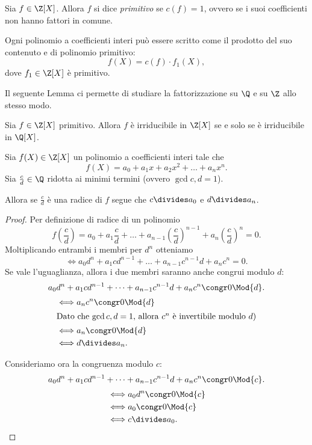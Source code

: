 \begin{definition}
    Sia $f \in \Z[X]$. Allora $f$ si dice \emph{primitivo} se $c(f) = 1$, ovvero se i suoi coefficienti non hanno fattori in comune.
\end{definition}

\begin{remark}
    Ogni polinomio a coefficienti interi può essere scritto come il prodotto del suo contenuto e di polinomio primitivo: \[
        f(X) = c(f) \cdot f_1(X),    
    \] dove $f_1 \in \Z[X]$ è primitivo.
\end{remark}

Il seguente Lemma ci permette di studiare la fattorizzazione su $\Q$ e su $\Z$ allo stesso modo.
\begin{theorem}
     Sia $f \in \Z[X]$ primitivo. Allora $f$ è irriducibile in $\Z[X]$ se e solo se è irriducibile in $\Q[X]$.
\end{theorem}

\begin{proposition}
    Sia $f(X) \in \Z[X]$ un polinomio a coefficienti interi tale che \[
        f(X) = a_0 + a_1x + a_2x^2 + \dots + a_nx^n.    
    \] Sia $\frac{c}{d} \in \Q$ ridotta ai minimi termini (ovvero $\gcd{c, d} = 1$). 
    
    Allora se $\frac{c}{d}$ è una radice di $f$ segue che $c \divides a_0$ e $d \divides a_n$.
\end{proposition}
\begin{proof}
    Per definizione di radice di un polinomio \[
        f\left(\frac{c}{d}\right) = a_0 + a_1\frac{c}{d} + \dots + a_{n-1}\left(\frac{c}{d}\right)^{n-1} + a_n\left(\frac{c}{d}\right)^n = 0.
    \]
    Moltiplicando entrambi i membri per $d^n$ otteniamo \[
        \iff a_0d^n + a_1cd^{n-1} + \dots + a_{n-1}c^{n-1}d + a_nc^n = 0.
    \]
    Se vale l'uguaglianza, allora i due membri saranno anche congrui modulo $d$: \[
        a_0d^n + a_1cd^{n-1} + \dots + a_{n-1}c^{n-1}d + a_nc^n \congr 0 \Mod{d}.
    \]
    \begin{align*}
        \iff &a_nc^n \congr 0 \Mod{d} \\
        \intertext{Dato che $\gcd{c, d} = 1$, allora $c^n$ è invertibile modulo $d$)}
        \iff &a_n \congr 0 \Mod{d}\\
        \iff &d \divides a_n.
    \end{align*}

    Consideriamo ora la congruenza modulo $c$: \[
        a_0d^n + a_1cd^{n-1} + \dots + a_{n-1}c^{n-1}d + a_nc^n \congr 0 \Mod{c}.
    \]
    \begin{align*}
        \iff &a_0d^n \congr 0 \Mod{c}\\
        \iff &a_0 \congr 0 \Mod{c} \\
        \iff &c \divides a_0. \qedhere
    \end{align*}
\end{proof}

